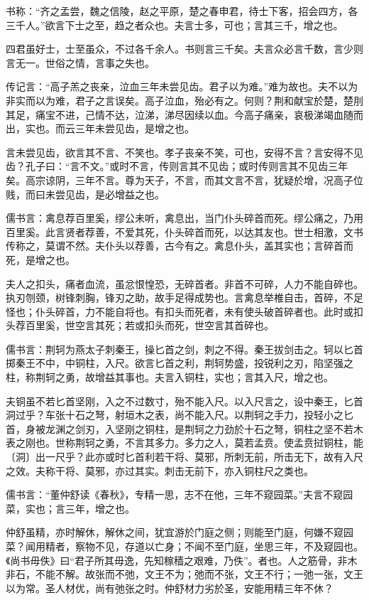 \documentclass[]{article}
\begin{document}
书称：``齐之孟尝，魏之信陵，赵之平原，楚之春申君，待士下客，招会四方，各三千人。''欲言下士之至，趋之者众也。夫言士多，可也；言其三千，增之也。

四君虽好士，士至虽众，不过各千余人。书则言三千矣。夫言众必言千数，言少则言无一。世俗之情，言事之失也。

传记言：``高子羔之丧亲，泣血三年未尝见齿。君子以为难。''难为故也。夫不以为非实而以为难，君子之言误矣。高子泣血，殆必有之。何则？荆和献宝於楚，楚刖其足，痛宝不进，己情不达，泣涕，涕尽因续以血。今高子痛亲，哀极涕竭血随而出，实也。而云三年未尝见齿，是增之也。

言未尝见齿，欲言其不言、不笑也。孝子丧亲不笑，可也，安得不言？言安得不见齿？孔子曰：``言不文。''或时不言，传则言其不见齿；或时传则言其不见齿三年矣。高宗谅阴，三年不言。尊为天子，不言，而其文言不言，犹疑於增，况高子位贱，而曰未尝见齿，是必增益之也。

儒书言：禽息荐百里奚，缪公未听，禽息出，当门仆头碎首而死。缪公痛之，乃用百里奚。此言贤者荐善，不爱其死，仆头碎首而死，以达其友也。世士相激，文书传称之，莫谓不然。夫仆头以荐善，古今有之。禽息仆头，盖其实也；言碎首而死，是增之也。

夫人之扣头，痛者血流，虽忿恨惶恐，无碎首者。非首不可碎，人力不能自碎也。执刃刎颈，树锋刺胸，锋刃之助，故手足得成势也。言禽息举椎自击，首碎，不足怪也；仆头碎首，力不能自将也。有扣头而死者，未有使头破首碎者也。此时或扣头荐百里奚，世空言其死；若或扣头而死，世空言其首碎也。

儒书言：荆轲为燕太子刺秦王，操匕首之剑，刺之不得。秦王拔剑击之。轲以匕首掷秦王不中，中铜柱，入尺。欲言匕首之利，荆轲势盛，投锐利之刃，陷坚强之柱，称荆轲之勇，故增益其事也。夫言入铜柱，实也；言其入尺，增之也。

夫铜虽不若匕首坚刚，入之不过数寸，殆不能入尺。以入尺言之，设中秦王，匕首洞过乎？车张十石之弩，射垣木之表，尚不能入尺。以荆轲之手力，投轻小之匕首，身被龙渊之剑刃，入坚刚之铜柱，是荆轲之力劲於十石之弩，铜柱之坚不若木表之刚也。世称荆轲之勇，不言其多力。多力之人，莫若孟贲。使孟贲挝铜柱，能〔洞〕出一尺乎？此亦或时匕首利若干将、莫邪，所刺无前，所击无下，故有入尺之效。夫称干将、莫邪，亦过其实。刺击无前下，亦入铜柱尺之类也。

儒书言：``董仲舒读《春秋》，专精一思，志不在他，三年不窥园菜。''夫言不窥园菜，实也；言三年，增之也。

仲舒虽精，亦时解休，解休之间，犹宜游於门庭之侧；则能至门庭，何嫌不窥园菜？闻用精者，察物不见，存道以亡身；不闻不至门庭，坐思三年，不及窥园也。《尚书毋佚》曰``君子所其毋逸，先知稼穑之艰难，乃佚''。者也。人之筋骨，非木非石，不能不解。故张而不弛，文王不为；弛而不张，文王不行；一弛一张，文王以为常。圣人材优，尚有弛张之时。仲舒材力劣於圣，安能用精三年不休？
\end{document}
